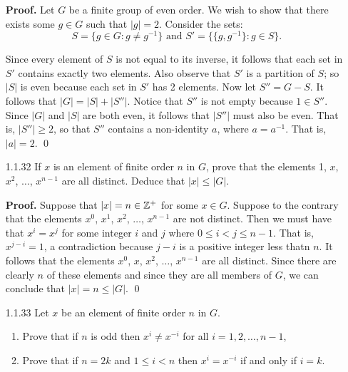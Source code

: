 \begin{enumerate}
      \textbf{Proof.} Let $G$ be a finite group of even order. We wish to show
      that there exists some $g \in G$ such that $|g| = 2$. Consider the sets:
      $$S = \{g \in G: g \neq g^{-1}\} \text{ and }
        S' = \{\{g, g^{-1}\} : g \in S\}.$$

      Since every element of $S$ is not equal to its inverse, it follows that
      each set in $S'$ contains exactly two elements. Also observe that $S'$ is
      a partition of $S$; so $|S|$ is even because each set in $S'$ has 2 
      elements. Now let $S'' = G - S$. It follows that $|G| = |S| + |S''|$. 
      Notice that $S''$ is not empty because $1 \in S''$. Since $|G|$ and $|S|$ 
      are both even, it follows that $|S''|$ must also be even. That is,
      $|S''| \ge 2$, so that $S''$ contains a non-identity $a$, where
      $a = a^{-1}$. That is, $|a| = 2$. \qed
   \item[1.1.32]  If $x$ is an element of finite order $n$ in $G$, prove that
                  the elements 1, $x$, $x^2$, $\ldots$, $x^{n-1}$ are all 
                  distinct. Deduce that $|x| \le |G|$.

      \textbf{Proof.} Suppose that $|x| = n \in \mathbb{Z}^+$ for some $x \in G$. 
      Suppose to the contrary that the elements $x^0$, $x^1$, $x^2$, $\ldots$, 
      $x^{n-1}$ are not distinct. Then we must have that $x^i = x^j$ for some
      integer $i$ and $j$ where $0 \le i < j \le n - 1$. That is, $x^{j-i} = 1$,
      a contradiction because $j - i$ is a positive integer less thatn $n$. It
      follows that the elements $x^0$, $x$, $x^2$, $\ldots$, $x^{n-1}$ are all 
      distinct. Since there are clearly $n$ of these elements and since they are
      all members of $G$, we can conclude that $|x| = n \le |G|$. \qed
   \item[1.1.33]  Let $x$ be an element of finite order $n$ in $G$.
                  \begin{enumerate}
                     \item Prove that if $n$ is odd then $x^i \neq x^{-i}$ for
                           all $i = 1, 2, \ldots, n - 1$,
                     \item Prove that if $n = 2k$ and $1 \le i < n$ then
                           $x^i = x^{-i}$ if and only if $i = k$.
                  \end{enumerate}


\end{enumerate}
